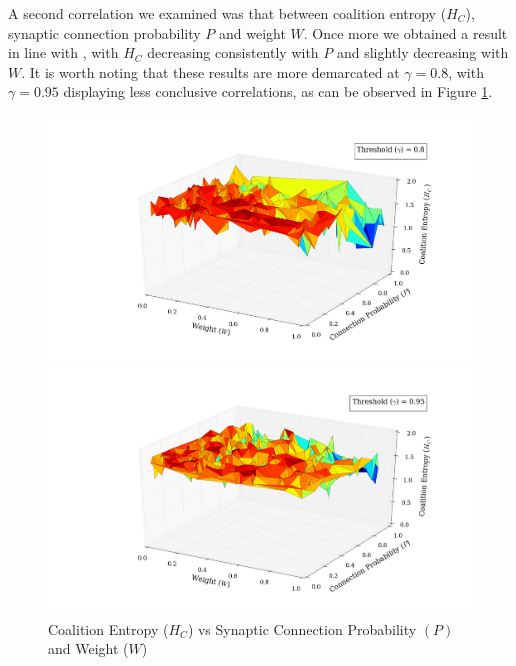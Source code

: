 \documentclass[a4paper,11pt]{article}
\begin{document}
A second correlation we examined was that between coalition entropy ($H_C$), synaptic connection probability $P$ and weight $W$. Once more we obtained a result in line with \cite{Bhowmik2013}, with $H_C$ decreasing consistently with $P$ and slightly decreasing with $W$. It is worth noting that these results are more demarcated at $\gamma = 0.8$, with $\gamma = 0.95$ displaying less conclusive correlations, as can be observed in Figure \ref{fig:p_w_hc_all}.

\begin{figure}[H] 
	\begin{minipage}[b]{0.5\linewidth}
		\begin{center}
		\includegraphics[scale = 0.2]{figures/snn/p_w_hc_8_1}
		\end{center}
		\vspace{4ex}
	\end{minipage}
	\begin{minipage}[b]{0.5\linewidth}
		\begin{center}
		\includegraphics[scale = 0.2]{figures/snn/p_w_hc_95_1}
		\end{center}
		\vspace{4ex}
	\end{minipage}
	\caption{
			Coalition Entropy ($H_C$) vs Synaptic Connection Probability $(P)$ and Weight ($W$)
			\label{fig:p_w_hc_all}
		}
\end{figure}
\end{document}
